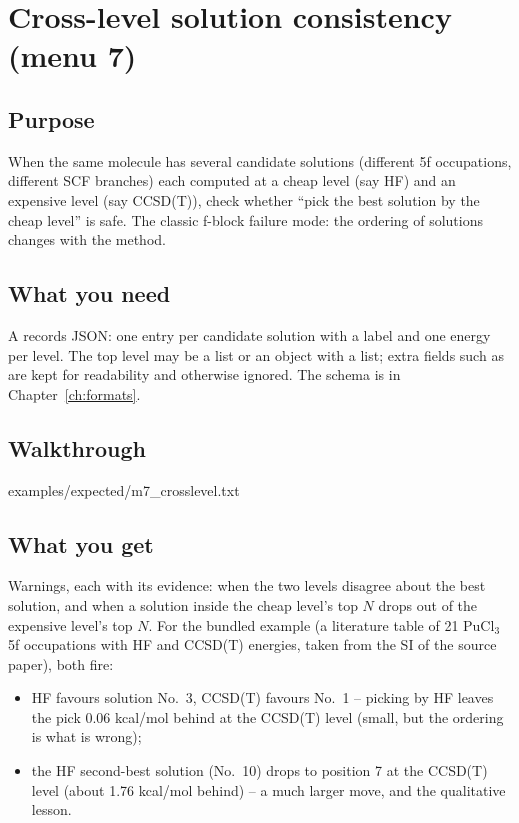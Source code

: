 \chapter{Cross-level solution consistency (menu 7)}
\label{ch:menu7}

\section{Purpose}

When the same molecule has several candidate solutions (different 5f
occupations, different SCF branches) each computed at a cheap level (say HF)
and an expensive level (say CCSD(T)), check whether ``pick the best solution by
the cheap level'' is safe. The classic f-block failure mode: the ordering of
solutions changes with the method.

\section{What you need}

A records JSON: one entry per candidate solution with a label and one energy
per level. The top level may be a list or an object with a  list;
extra fields such as  are kept for readability and otherwise
ignored. The schema is in Chapter~\ref{ch:formats}.

\section{Walkthrough}


  {examples/expected/m7_crosslevel.txt}

\section{What you get}

Warnings, each with its evidence: when the two levels disagree about the best
solution, and when a solution inside the cheap level's top $N$ drops out of the
expensive level's top $N$. For the bundled example (a literature table of 21
PuCl$_3$ 5f occupations with HF and CCSD(T) energies, taken from the SI of the
source paper), both fire:

\begin{itemize}
  \item HF favours solution No.~3, CCSD(T) favours No.~1 -- picking by HF
    leaves the pick 0.06 kcal/mol behind at the CCSD(T) level (small, but the
    ordering is what is wrong);
  \item the HF second-best solution (No.~10) drops to position 7 at the
    CCSD(T) level (about 1.76 kcal/mol behind) -- a much larger move, and the
    qualitative lesson.
\end{itemize}


